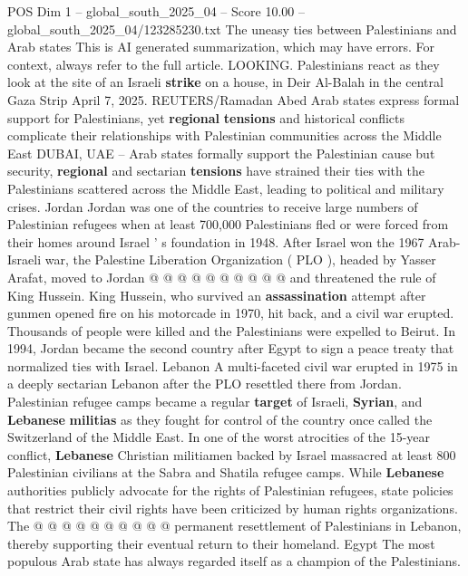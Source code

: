 \begin{textsample}{POS Dim 1 – global\_south\_2025\_04 – Score 10.00 – global\_south\_2025\_04/123285230.txt}  \label{ex:f1_pos_329}
The uneasy ties between Palestinians and Arab states This is AI generated summarization, which may have errors.
For context, always refer to the full article.
LOOKING.
Palestinians react as they look at the site of an Israeli \textbf{strike} on a house, in Deir Al-Balah in the central Gaza Strip April 7, 2025.
REUTERS/Ramadan Abed Arab states express formal support for Palestinians, yet \textbf{regional} \textbf{tensions} and historical conflicts complicate their relationships with Palestinian communities across the Middle East DUBAI, UAE -- Arab states formally support the Palestinian cause but security, \textbf{regional} and sectarian \textbf{tensions} have strained their ties with the Palestinians scattered across the Middle East, leading to political and military crises.
Jordan Jordan was one of the countries to receive large numbers of Palestinian refugees when at least 700,000 Palestinians fled or were forced from their homes around Israel ' s foundation in 1948.
After Israel won the 1967 Arab-Israeli war, the Palestine Liberation Organization ( PLO ), headed by Yasser Arafat, moved to Jordan @ @ @ @ @ @ @ @ @ @ and threatened the rule of King Hussein.
King Hussein, who survived an \textbf{assassination} attempt after gunmen opened fire on his motorcade in 1970, hit back, and a civil war erupted.
Thousands of people were killed and the Palestinians were expelled to Beirut.
In 1994, Jordan became the second country after Egypt to sign a peace treaty that normalized ties with Israel.
Lebanon A multi-faceted civil war erupted in 1975 in a deeply sectarian Lebanon after the PLO resettled there from Jordan.
Palestinian refugee camps became a regular \textbf{target} of Israeli, \textbf{Syrian}, and \textbf{Lebanese} \textbf{militias} as they fought for control of the country once called the Switzerland of the Middle East.
In one of the worst atrocities of the 15-year conflict, \textbf{Lebanese} Christian militiamen backed by Israel massacred at least 800 Palestinian civilians at the Sabra and Shatila refugee camps.
While \textbf{Lebanese} authorities publicly advocate for the rights of Palestinian refugees, state policies that restrict their civil rights have been criticized by human rights organizations.
The @ @ @ @ @ @ @ @ @ @ permanent resettlement of Palestinians in Lebanon, thereby supporting their eventual return to their homeland.
Egypt The most populous Arab state has always regarded itself as a champion of the Palestinians.

\end{textsample}
